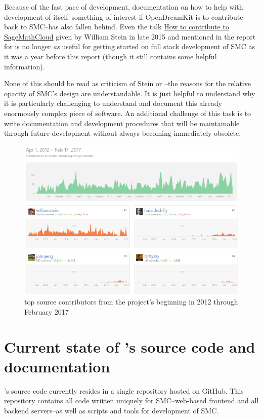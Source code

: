 \documentclass{deliverablereport}
\begin{document}
Because of the fast pace of development, documentation on how to help with
development of \SMC itself--something of interest if OpenDreamKit is to
contribute back to SMC--has also fallen behind.  Even the talk
\href{https://youtu.be/GOuy07Kift4}{How to contribute to SageMathCloud} given
by William Stein in late 2015 and mentioned in the report for
 is no longer \emph{as} useful for getting
started on full stack development of SMC as it was a year before this report
(though it still contains some helpful information).

None of this should be read as criticism of Stein or \SMC--the reasons for the
relative opacity of SMC's design are understandable.  It is just helpful to
understand why it is particularly challenging to understand and document this
already enormously complex piece of software.  An additional challenge of this
task is to write documentation and development procedures that will be
maintainable through future development without always becoming immediately
obsolete.

\begin{figure}
\includegraphics[width=\textwidth]{images/smc-contributions-2017-02-17.png}
\caption{top \SMC source contributors from the project's beginning in 2012 through February 2017}
\end{figure}

\section{Current state of \SMC's source code and documentation}

\SMC's source code currently resides in a single  repository
hosted on GitHub.  This repository contains all code written uniquely for
SMC--web-based frontend and all backend servers--as well as scripts and tools
for development of SMC.
\end{document}

